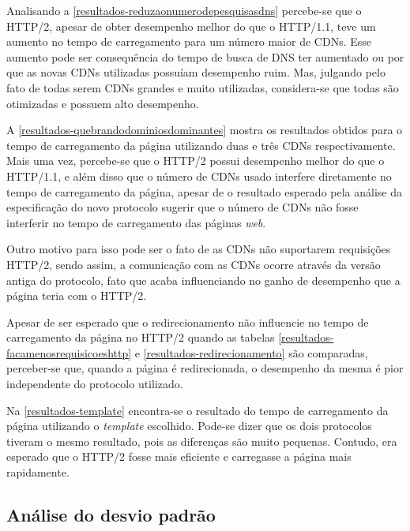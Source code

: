 Analisando a \autoref{resultados-reduzaonumerodepesquisasdns} percebe-se que o HTTP/2, apesar de obter desempenho melhor do que o HTTP/1.1, teve um aumento no tempo de carregamento para um número maior de CDNs. Esse aumento pode ser consequência do tempo de busca de DNS ter aumentado ou por que as novas CDNs utilizadas possuíam desempenho ruim. Mas, julgando pelo fato de todas serem CDNs grandes e muito utilizadas, considera-se que todas são otimizadas e possuem alto desempenho. 



A \autoref{resultados-quebrandodominiosdominantes} mostra os resultados obtidos para o tempo de carregamento da página utilizando duas e três CDNs respectivamente. Mais uma vez, percebe-se que o HTTP/2 possui desempenho melhor do que o HTTP/1.1, e além disso que o número de CDNs usado interfere diretamente no tempo de carregamento da página, apesar de o resultado esperado pela análise da especificação do novo protocolo sugerir que o número de CDNs não fosse interferir no tempo de carregamento das páginas \textit{web}.

Outro motivo para isso pode ser o fato de as CDNs não suportarem requisições HTTP/2, sendo assim, a comunicação com as CDNs ocorre através da versão antiga do protocolo, fato que acaba influenciando no ganho de desempenho que a página teria com o HTTP/2.



Apesar de ser esperado que o redirecionamento não influencie no tempo de carregamento da página no HTTP/2 quando as tabelas \ref{resultados-facamenosrequisicoeshttp} e \ref{resultados-redirecionamento} são comparadas, perceber-se que, quando a página é redirecionada, o desempenho da mesma é pior independente do protocolo utilizado.



Na \autoref{resultados-template} encontra-se o resultado do tempo de carregamento da página utilizando o \textit{template} escolhido. Pode-se dizer que os dois protocolos tiveram o mesmo resultado, pois as diferenças são muito pequenas. Contudo, era esperado que o HTTP/2 fosse mais eficiente e carregasse a página mais rapidamente.

\subsection{Análise do desvio padrão}
\label{desviopadrao}

